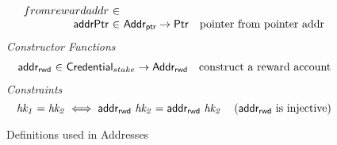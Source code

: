 \begin{figure*}[hbt]
\begin{equation*}
\begin{array}{r@{~\in~}lr}
{                                                   from reward addr}\\
      \fun{addrPtr} & \AddrP \to \Ptr
                    & \text{pointer from pointer addr}\\
    \end{array}
  \end{equation*}
  \emph{Constructor Functions}
  \begin{equation*}
    \begin{array}{r@{~\in~}lr}
      \fun{addr_{rwd}}
        & \Credential_{stake} \to \AddrRWD
        & \text{construct a reward account}
    \end{array}
  \end{equation*}
  \emph{Constraints}
  \begin{equation*}
    \mathit{hk_1} = \mathit{hk_2} \iff \mathsf{addr_{rwd}}~\mathit{hk_2} = \mathsf{addr_{rwd}}~\mathit{hk_2}
    ~~~ \left( \mathsf{addr_{rwd}} \text{ is injective} \right)
  \end{equation*}
  \caption{Definitions used in Addresses}
  \label{fig:defs:addresses}
\end{figure*}

\clearpage
